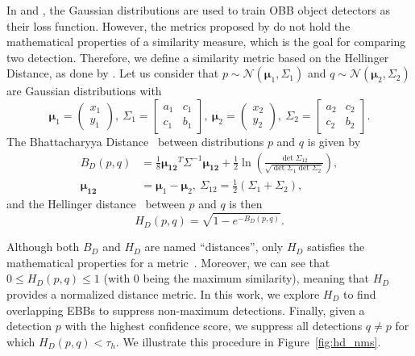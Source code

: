 \documentclass{article}
\begin{document}
In \cite{gwd,kld} and \cite{probiou}, the Gaussian distributions are used to train OBB object detectors as their loss function. However, the metrics proposed by \cite{gwd,kld} do not hold the mathematical properties of a similarity measure, which is the goal for comparing two detection.
Therefore, we define a similarity metric based on the Hellinger Distance, as done by \cite{probiou}. Let us consider that $p\sim\mathcal{N}(\bm{\mu}_1, \Sigma_1)$ and $q\sim\mathcal{N}(\bm{\mu}_2, \Sigma_2)$ are Gaussian distributions with 
\begin{equation}
    \bm{\mu}_1 = \begin{pmatrix}
    x_1 \\ y_1
    \end{pmatrix},~
    \Sigma_1 = \begin{bmatrix}
    a_1 & c_1\\
    c_1 & b_1 
    \end{bmatrix},~
    \bm{\mu}_2  = \begin{pmatrix}
    x_2 \\ y_2
    \end{pmatrix},~
    \Sigma_2 = \begin{bmatrix}
    a_2 & c_2\\
    c_2 & b_2 
    \end{bmatrix}.
\end{equation}
The Bhattacharyya Distance~\cite{bhattacharyya1946measure} between distributions $p$ and $q$ is given by 
\begin{align}
\label{eq:bhatta}
B_D(p,q) &= \frac{1}{8}\bm{\mu_{12}}^T\Sigma^{-1}\bm{\mu_{12}} +   \frac{1}{2}\ln \left( \frac{\det\Sigma_{12}}{\sqrt{\det\Sigma_1 \det\Sigma_2}}  \right), \\\nonumber
\bm{\mu_{12}} &= \bm{\mu}_1 - \bm{\mu}_2,~ \Sigma_{12} = \frac{1}{2}\left(\Sigma_1 + \Sigma_2\right),
\end{align}
and the Hellinger distance~\cite{hellinger1909neue} between $p$ and $q$ is then
\begin{equation}
    H_D(p,q) =\sqrt{1-e^{-B_D(p,q)}}.
    \label{eq:helinger}
\end{equation}

Although both $B_D$ and $H_D$ are named ``distances'', only $H_D$ satisfies the mathematical properties for a metric~\cite{kailath1967divergence}. Moreover, we can see that $0 \leq H_D(p,q) \leq 1$ (with $0$ being the maximum similarity), meaning that $H_D$ provides a normalized distance metric. In this work, we explore $H_D$ to find overlapping EBBs to suppress non-maximum detections. Finally, given a detection $p$ with the highest confidence score, we suppress all detections $q\neq p$ for which  $H_D(p,q)< \tau_h$. We illustrate this procedure in Figure~\ref{fig:hd_nms}.
\end{document}
